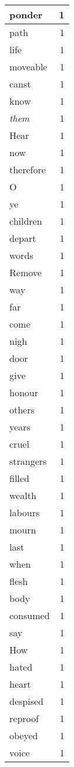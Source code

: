 \begin{center}
\begin{longtable}{l|r}
ponder & 1\\ \hline 
path & 1\\ \hline 
life & 1\\ \hline 
moveable & 1\\ \hline 
canst & 1\\ \hline 
know & 1\\ \hline 
\emph{them} & 1\\ \hline 
Hear & 1\\ \hline 
now & 1\\ \hline 
therefore & 1\\ \hline 
O & 1\\ \hline 
ye & 1\\ \hline 
children & 1\\ \hline 
depart & 1\\ \hline 
words & 1\\ \hline 
Remove & 1\\ \hline 
way & 1\\ \hline 
far & 1\\ \hline 
come & 1\\ \hline 
nigh & 1\\ \hline 
door & 1\\ \hline 
give & 1\\ \hline 
honour & 1\\ \hline 
others & 1\\ \hline 
years & 1\\ \hline 
cruel & 1\\ \hline 
strangers & 1\\ \hline 
filled & 1\\ \hline 
wealth & 1\\ \hline 
labours & 1\\ \hline 
mourn & 1\\ \hline 
last & 1\\ \hline 
when & 1\\ \hline 
flesh & 1\\ \hline 
body & 1\\ \hline 
consumed & 1\\ \hline 
say & 1\\ \hline 
How & 1\\ \hline 
hated & 1\\ \hline 
heart & 1\\ \hline 
despised & 1\\ \hline 
reproof & 1\\ \hline 
obeyed & 1\\ \hline 
voice & 1\\ \hline 

\end{longtable}
\end{center}
